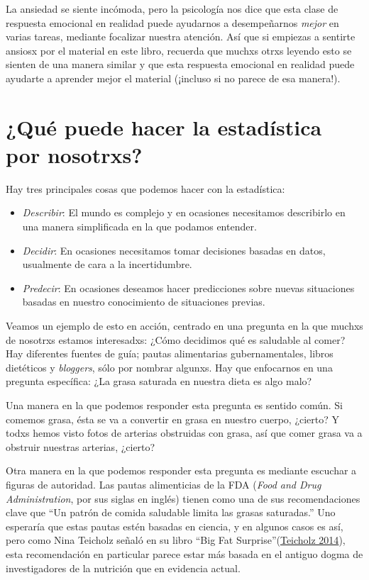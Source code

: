 \documentclass[
  12pt,
]{book}
\providecommand{\tightlist}{%
  \setlength{\itemsep}{0pt}\setlength{\parskip}{0pt}}
\begin{document}
La ansiedad se siente incómoda, pero la psicología nos dice que esta clase de respuesta emocional en realidad puede ayudarnos a desempeñarnos \emph{mejor} en varias tareas, mediante focalizar nuestra atención. Así que si empiezas a sentirte ansiosx por el material en este libro, recuerda que muchxs otrxs leyendo esto se sienten de una manera similar y que esta respuesta emocional en realidad puede ayudarte a aprender mejor el material (¡incluso si no parece de esa manera!).

\hypertarget{quuxe9-puede-hacer-la-estaduxedstica-por-nosotrxs}{%
\section{¿Qué puede hacer la estadística por nosotrxs?}\label{quuxe9-puede-hacer-la-estaduxedstica-por-nosotrxs}}

Hay tres principales cosas que podemos hacer con la estadística:

\begin{itemize}
\tightlist
\item
  \emph{Describir}: El mundo es complejo y en ocasiones necesitamos describirlo en una manera simplificada en la que podamos entender.
\item
  \emph{Decidir}: En ocasiones necesitamos tomar decisiones basadas en datos, usualmente de cara a la incertidumbre.
\item
  \emph{Predecir}: En ocasiones deseamos hacer predicciones sobre nuevas situaciones basadas en nuestro conocimiento de situaciones previas.
\end{itemize}

Veamos un ejemplo de esto en acción, centrado en una pregunta en la que muchxs de nosotrxs estamos interesadxs: ¿Cómo decidimos qué es saludable al comer? Hay diferentes fuentes de guía; pautas alimentarias gubernamentales, libros dietéticos y \emph{bloggers}, sólo por nombrar algunxs. Hay que enfocarnos en una pregunta específica: ¿La grasa saturada en nuestra dieta es algo malo?

Una manera en la que podemos responder esta pregunta es sentido común. Si comemos grasa, ésta se va a convertir en grasa en nuestro cuerpo, ¿cierto? Y todxs hemos visto fotos de arterias obstruidas con grasa, así que comer grasa va a obstruir nuestras arterias, ¿cierto?

Otra manera en la que podemos responder esta pregunta es mediante escuchar a figuras de autoridad. Las pautas alimenticias de la FDA (\emph{Food and Drug Administration}, por sus siglas en inglés) tienen como una de sus recomendaciones clave que ``Un patrón de comida saludable limita las grasas saturadas.'' Uno esperaría que estas pautas estén basadas en ciencia, y en algunos casos es así, pero como Nina Teicholz señaló en su libro ``Big Fat Surprise''(\protect\hyperlink{ref-teic:2014}{Teicholz 2014}), esta recomendación en particular parece estar más basada en el antiguo dogma de investigadores de la nutrición que en evidencia actual.
\end{document}

